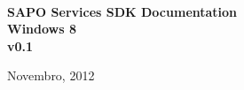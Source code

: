 \frontmatter

\begin{titlepage}
	\begin{center}
		
		
		 \\[2cm] 
		
		
		\centering \huge{\textbf{SAPO Services SDK Documentation\\ Windows 8\\ v0.1}} \\ [1.5cm]
		
		\vspace*{\fill} 
		
		
		
		Novembro, 2012
		
	\end{center}	
\end{titlepage}

\cleardoublepage
\newpage


\cleardoublepage
\newpage

	\setlength{\parskip}{1ex plus 0.5ex minus 0.2ex}
	\setlength{\parindent}{0pt}

\tableofcontents

\listoffigures

\listoftables

\lstlistoflistings